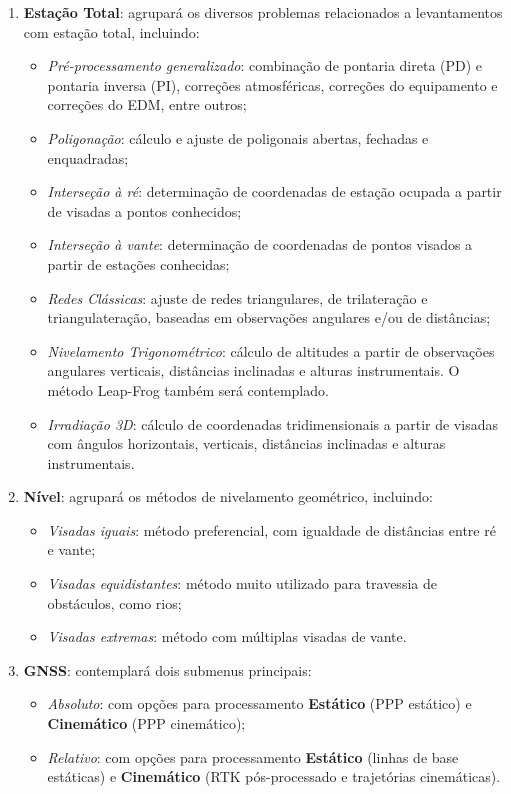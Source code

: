 \documentclass[
        12pt,                           %
        openright,                      %
        oneside,
        a4paper,                        %
        chapter=TITLE,         %
        section=TITLE,         %
        subsection=Title,      %
        english,                        %
        portugues,                      %
        ]{abntex2}
\begin{document}
\begin{enumerate}[label=\arabic*.]
    \item \textbf{Estação Total}: agrupará os diversos problemas relacionados a levantamentos com estação total, incluindo:
    \begin{itemize}
        \item \textit{Pré-processamento generalizado}: combinação de pontaria direta (PD) e pontaria inversa (PI), correções atmosféricas, correções do equipamento e correções do EDM, entre outros;
        \item \textit{Poligonação}: cálculo e ajuste de poligonais abertas, fechadas e enquadradas;
        \item \textit{Interseção à ré}: determinação de coordenadas de estação ocupada a partir de visadas a pontos conhecidos;
        \item \textit{Interseção à vante}: determinação de coordenadas de pontos visados a partir de estações conhecidas;
        \item \textit{Redes Clássicas}: ajuste de redes triangulares, de trilateração e triangulateração, baseadas em observações angulares e/ou de distâncias;
        \item \textit{Nivelamento Trigonométrico}: cálculo de altitudes a partir de observações angulares verticais, distâncias inclinadas e alturas instrumentais. O método Leap-Frog também será contemplado.
        \item \textit{Irradiação 3D}: cálculo de coordenadas tridimensionais a partir de visadas com ângulos horizontais, verticais, distâncias inclinadas e alturas instrumentais. 
    \end{itemize}
    
    \item \textbf{Nível}: agrupará os métodos de nivelamento geométrico, incluindo:
    \begin{itemize}
        \item \textit{Visadas iguais}: método preferencial, com igualdade de distâncias entre ré e vante;
        \item \textit{Visadas equidistantes}: método muito utilizado para travessia de obstáculos, como rios;
        \item \textit{Visadas extremas}: método com múltiplas visadas de vante.
    \end{itemize}
    
    \item \textbf{GNSS}: contemplará dois submenus principais:
    \begin{itemize}
        \item \textit{Absoluto}: com opções para processamento \textbf{Estático} (PPP estático) e \textbf{Cinemático} (PPP cinemático);
        \item \textit{Relativo}: com opções para processamento \textbf{Estático} (linhas de base estáticas) e \textbf{Cinemático} (RTK pós-processado e trajetórias cinemáticas).
    \end{itemize}


\end{enumerate}
\end{document}

